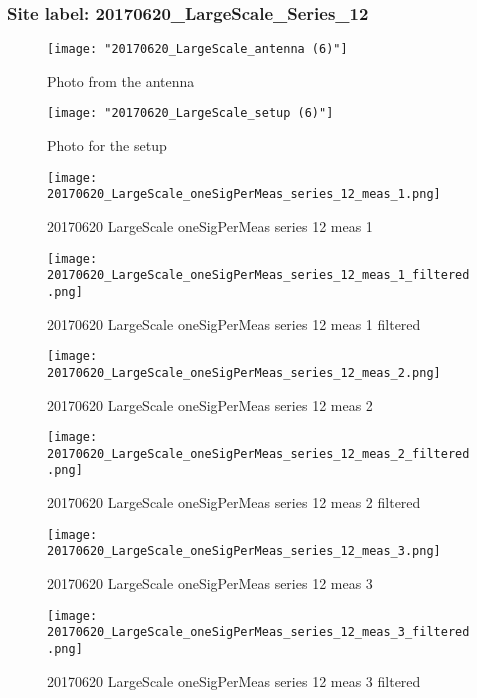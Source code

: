 \subsubsection{Site label: 20170620\_LargeScale\_Series\_12}
\begin{figure}[ht] \caption{Photo from the antenna}
\texttt{[image: "20170620\_LargeScale\_antenna (6)"]}\centering\end{figure}
\begin{figure}[ht] \caption{Photo for the setup}
\texttt{[image: "20170620\_LargeScale\_setup (6)"]}\centering\end{figure}
\begin{figure}[ht] \caption{20170620 LargeScale oneSigPerMeas series 12 meas 1}
\texttt{[image: 20170620\_LargeScale\_oneSigPerMeas\_series\_12\_meas\_1.png]}\centering\end{figure}
\begin{figure}[ht] \caption{20170620 LargeScale oneSigPerMeas series 12 meas 1 filtered}
\texttt{[image: 20170620\_LargeScale\_oneSigPerMeas\_series\_12\_meas\_1\_filtered.png]}\centering\end{figure}
\begin{figure}[ht] \caption{20170620 LargeScale oneSigPerMeas series 12 meas 2}
\texttt{[image: 20170620\_LargeScale\_oneSigPerMeas\_series\_12\_meas\_2.png]}\centering\end{figure}
\begin{figure}[ht] \caption{20170620 LargeScale oneSigPerMeas series 12 meas 2 filtered}
\texttt{[image: 20170620\_LargeScale\_oneSigPerMeas\_series\_12\_meas\_2\_filtered.png]}\centering\end{figure}
\begin{figure}[ht] \caption{20170620 LargeScale oneSigPerMeas series 12 meas 3}
\texttt{[image: 20170620\_LargeScale\_oneSigPerMeas\_series\_12\_meas\_3.png]}\centering\end{figure}
\begin{figure}[ht] \caption{20170620 LargeScale oneSigPerMeas series 12 meas 3 filtered}
\texttt{[image: 20170620\_LargeScale\_oneSigPerMeas\_series\_12\_meas\_3\_filtered.png]}\centering\end{figure}
\clearpage
